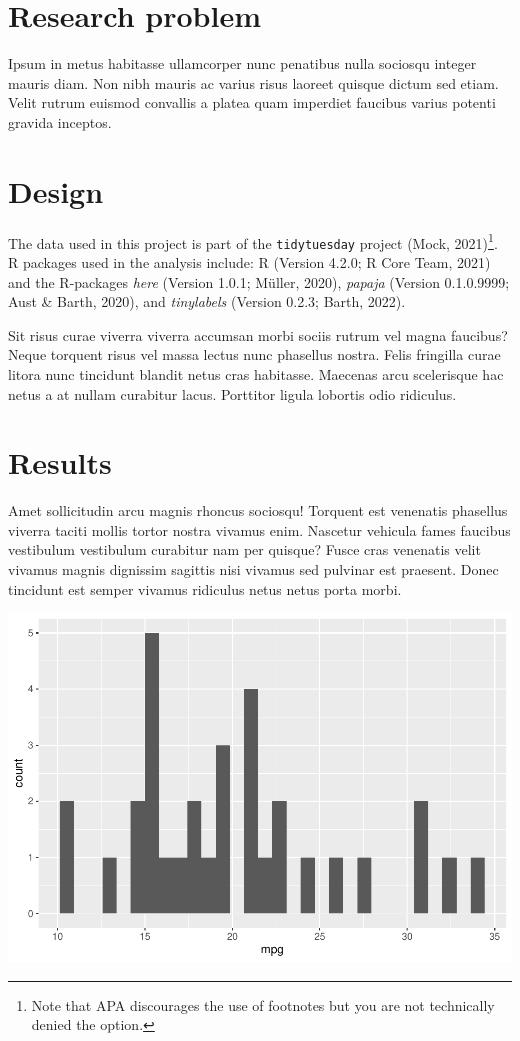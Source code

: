 \documentclass[
  man]{apa6}
\begin{document}
\hypertarget{research-problem}{%
\section{Research problem}\label{research-problem}}

Ipsum in metus habitasse ullamcorper nunc penatibus nulla sociosqu integer mauris diam. Non nibh mauris ac varius risus laoreet quisque dictum sed etiam. Velit rutrum euismod convallis a platea quam imperdiet faucibus varius potenti gravida inceptos.

\hypertarget{design}{%
\section{Design}\label{design}}

The data used in this project is part of the \texttt{tidytuesday} project (Mock, 2021)\footnote{Note that APA discourages the use of footnotes but you are not technically denied the option.}. R packages used in the analysis include: R (Version 4.2.0; R Core Team, 2021) and the R-packages \emph{here} (Version 1.0.1; Müller, 2020), \emph{papaja} (Version 0.1.0.9999; Aust \& Barth, 2020), and \emph{tinylabels} (Version 0.2.3; Barth, 2022).

Sit risus curae viverra viverra accumsan morbi sociis rutrum vel magna faucibus? Neque torquent risus vel massa lectus nunc phasellus nostra. Felis fringilla curae litora nunc tincidunt blandit netus cras habitasse. Maecenas arcu scelerisque hac netus a at nullam curabitur lacus. Porttitor ligula lobortis odio ridiculus.

\hypertarget{results}{%
\section{Results}\label{results}}

Amet sollicitudin arcu magnis rhoncus sociosqu! Torquent est venenatis phasellus viverra taciti mollis tortor nostra vivamus enim. Nascetur vehicula fames faucibus vestibulum vestibulum curabitur nam per quisque? Fusce cras venenatis velit vivamus magnis dignissim sagittis nisi vivamus sed pulvinar est praesent. Donec tincidunt est semper vivamus ridiculus netus netus porta morbi.

\includegraphics{draft_files/figure-latex/unnamed-chunk-1-1.pdf}
\end{document}
